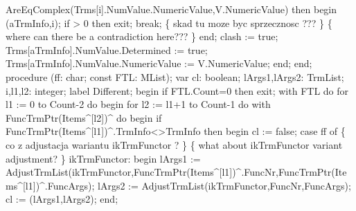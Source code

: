                   AreEqComplex(Trms[i].NumValue.NumericValue,V.NumericValue)  then
            begin
               (aTrmInfo,i);
               if  > 0 then exit;
               break;
               \{ skad tu moze byc sprzecznosc ??? \}
               \{ where can there be a contradiction here??? \}
            end;
      clash := true;
      Trms[aTrmInfo].NumValue.Determined := true;
      Trms[aTrmInfo].NumValue.NumericValue := V.NumericValue;
   end;
end;
\eatline
{}\nwendcode{}\nwdocspar
\nwenddocs{}\endmoddef\nwstartdeflinemarkup\nwenddeflinemarkup
procedure (ff: char;
              const FTL: MList);
var
   cl: boolean;
   lArgs1,lArgs2: TrmList;
   i,l1,l2: integer;
label Different;
begin
   if FTL.Count=0 then exit;
   with FTL do
      for l1 := 0 to Count-2 do
      begin
         for l2 := l1+1 to Count-1 do
            with FuncTrmPtr(Items^[l2])^ do
         begin
            if FuncTrmPtr(Items^[l1])^.TrmInfo<>TrmInfo then
            begin
               cl := false;
               case ff of
                  \{ co z adjustacja wariantu ikTrmFunctor ? \}
                  \{ what about ikTrmFunctor variant adjustment? \}
                  ikTrmFunctor:
                     begin
                        lArgs1 := AdjustTrmList(ikTrmFunctor,FuncTrmPtr(Items^[l1])^.FuncNr,FuncTrmPtr(Items^[l1])^.FuncArgs);
                        lArgs2 := AdjustTrmList(ikTrmFunctor,FuncNr,FuncArgs);
                        cl := (lArgs1,lArgs2);
                     end;

